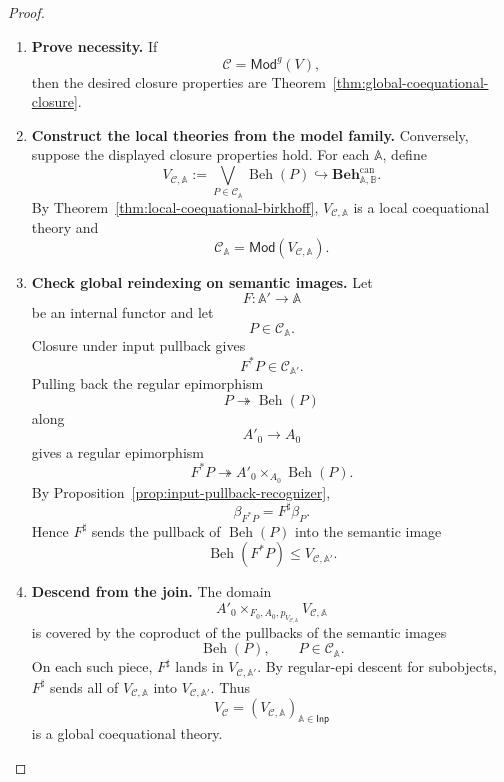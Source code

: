 \begin{proof}
    \leavevmode
    \begin{enumerate}
        \item \textbf{Prove necessity.}
        If
        \[
            \mathcal C=\mathsf{Mod}^{g}(V),
        \]
        then the desired closure properties are
        Theorem~\ref{thm:global-coequational-closure}.

        \item \textbf{Construct the local theories from the model family.}
        Conversely, suppose the displayed closure properties hold. For each
        \(\mathbb A\), define
        \[
            V_{\mathcal C,\mathbb A}
            :=
            \bigvee_{P\in\mathcal C_{\mathbb A}}
            \operatorname{Beh}(P)
            \hookrightarrow
            \mathbf{Beh}^{\mathrm{can}}_{\mathbb A,\mathbb B}.
        \]
        By Theorem~\ref{thm:local-coequational-birkhoff},
        \(V_{\mathcal C,\mathbb A}\) is a local coequational theory and
        \[
            \mathcal C_{\mathbb A}
            =
            \mathsf{Mod}(V_{\mathcal C,\mathbb A}).
        \]

        \item \textbf{Check global reindexing on semantic images.}
        Let
        \[
            F:\mathbb A'\to\mathbb A
        \]
        be an internal functor and let
        \[
            P\in\mathcal C_{\mathbb A}.
        \]
        Closure under input pullback gives
        \[
            F^*P\in\mathcal C_{\mathbb A'}.
        \]
        Pulling back the regular epimorphism
        \[
            P\twoheadrightarrow\operatorname{Beh}(P)
        \]
        along
        \[
            A'_0\to A_0
        \]
        gives a regular epimorphism
        \[
            F^*P
            \twoheadrightarrow
            A'_0\times_{A_0}\operatorname{Beh}(P).
        \]
        By Proposition~\ref{prop:input-pullback-recognizer},
        \[
            \beta_{F^*P}=F^\sharp\beta_P.
        \]
        Hence \(F^\sharp\) sends the pullback of \(\operatorname{Beh}(P)\) into
        the semantic image
        \[
            \operatorname{Beh}(F^*P)
            \leq
            V_{\mathcal C,\mathbb A'}.
        \]

        \item \textbf{Descend from the join.}
        The domain
        \[
            A'_0\times_{F_0,A_0,p_{V_{\mathcal C,\mathbb A}}}
            V_{\mathcal C,\mathbb A}
        \]
        is covered by the coproduct of the pullbacks of the semantic images
        \[
            \operatorname{Beh}(P),
            \qquad
            P\in\mathcal C_{\mathbb A}.
        \]
        On each such piece, \(F^\sharp\) lands in
        \(V_{\mathcal C,\mathbb A'}\). By regular-epi descent for subobjects,
        \(F^\sharp\) sends all of \(V_{\mathcal C,\mathbb A}\) into
        \(V_{\mathcal C,\mathbb A'}\). Thus
        \[
            V_{\mathcal C}
            =
            (V_{\mathcal C,\mathbb A})_{\mathbb A\in\mathsf{Inp}}
        \]
        is a global coequational theory.


\end{enumerate}
\end{proof}
